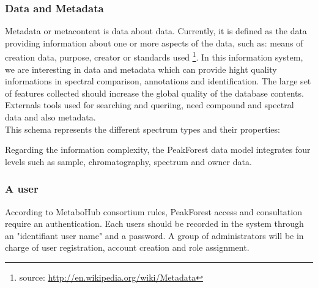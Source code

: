 

\subsubsection{Data and Metadata}
Metadata or metacontent is data about data. Currently, it is defined as the data providing information about one or more aspects of the data, such as: means of creation data, purpose, creator or standards used \footnote{source: \url{http://en.wikipedia.org/wiki/Metadata}}.
In this information system, we are interesting in data and metadata which can provide hight quality informations in spectral comparison, annotations and identification. The large set of features collected should increase the global quality of the database contents. Externals tools used for searching and queriing, need compound and spectral data and also metadata.\\

This schema represents the different spectrum types and their properties:


\begin{figure}[htbp]
	\centering
\end{figure}

Regarding the information complexity, the PeakForest data model integrates four levels such as sample, chromatography, spectrum and owner data.


\subsubsection{A user}
According to MetaboHub consortium rules, PeakForest access and consultation require an authentication. Each users should be recorded in the system through an "identifiant user name" and a password. A group of administrators will be in charge of user registration, account creation and role assignment.


